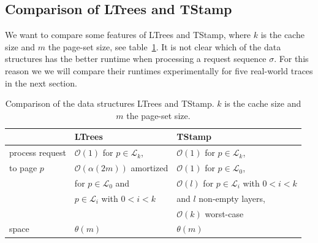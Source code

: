 \documentclass[a4paper,12pt, titlepage]{article}  %
\newcommand{\cl}{\mathcal{L}}   %
\newcommand{\oh}{\mathcal{O}}   %
\begin{document}
\newpage
\subsection{Comparison of LTrees and TStamp}
We want to compare some features of LTrees and TStamp, where
$k$ is the cache size and $m$ the page-set size, see table~\ref{tab:comparison}.
It is not clear which of the data structures has the better runtime when processing a request sequence $\sigma$.
For this reason we we will compare their runtimes experimentally for five real-world traces in the next section.


\begin{table}[hb]
\begin{center}
	\begin{tabular}{|l||l|l|}
	  	\hline
		                                 &        LTrees                                      &   TStamp                  \\
		\hline  
		process request   &        $\oh(1)$ for $p \in \cl_k$,                  & $\oh(1)$ for $p \in \cl_k$,                 \\
                 to page $p$        &	    $\oh( \alpha(2m))$ amortized              & $\oh(1)$ for $p \in \cl_0$,                 \\      
                                          &        for $p \in \cl_0$  and                          & $\oh(l)$ for $p \in \cl_i$ with  $0<i<k$ \\
                                          &        $p \in \cl_i$ with  $0<i<k$                  & and $l$ non-empty layers, \\
                                         &                                                                 &  $\oh(k)$ worst-case                    \\
		\hline
		space                       &          $\theta(m)$                              &  $\theta(m)$  \\     
                \hline
	\end{tabular}
	\caption{Comparison of the data structures LTrees and TStamp. 
                     $k$ is the cache size and $m$ the page-set size.}
        \label{tab:comparison}
\end{center}
\end{table}
\end{document}
